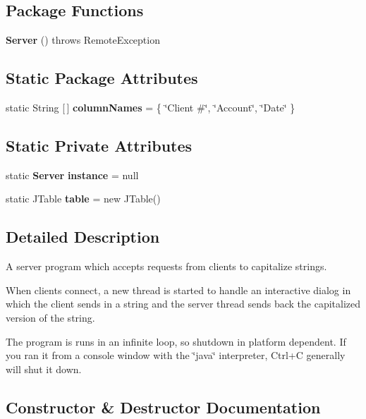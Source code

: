 \subsection*{Package Functions}
\begin{DoxyCompactItemize}
\item 
\textbf{ Server} ()  throws Remote\+Exception 
\end{DoxyCompactItemize}
\subsection*{Static Package Attributes}
\begin{DoxyCompactItemize}
\item 
static String [$\,$] \textbf{ column\+Names} = \{ \char`\"{}Client \#\char`\"{}, \char`\"{}Account\char`\"{}, \char`\"{}Date\char`\"{} \}
\end{DoxyCompactItemize}
\subsection*{Static Private Attributes}
\begin{DoxyCompactItemize}
\item 
static \textbf{ Server} \textbf{ instance} = null
\item 
static J\+Table \textbf{ table} = new J\+Table()
\end{DoxyCompactItemize}


\subsection{Detailed Description}
A server program which accepts requests from clients to capitalize strings. 

When clients connect, a new thread is started to handle an interactive dialog in which the client sends in a string and the server thread sends back the capitalized version of the string.

The program is runs in an infinite loop, so shutdown in platform dependent. If you ran it from a console window with the \char`\"{}java\char`\"{} interpreter, Ctrl+C generally will shut it down. 

\subsection{Constructor \& Destructor Documentation}
\mbox{\label{class_server_1_1_server_a77c4d462bec0f11da1fff5166c54b521}} 
